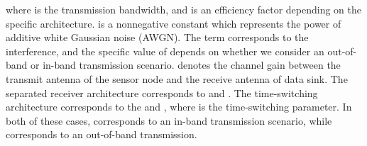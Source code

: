 \documentclass[12pt,draftclsnofoot,onecolumn]{IEEEtran}
\begin{document}
where  is the transmission bandwidth, and  is an efficiency factor depending on the specific architecture.  is a nonnegative constant which represents the power of additive white Gaussian noise (AWGN). The term  corresponds to the interference, and the specific value of  depends on whether we consider an out-of-band or in-band transmission scenario.  denotes the channel gain between the transmit antenna of the sensor node and the receive antenna of data sink. 
The separated receiver architecture corresponds to  and .
The time-switching architecture corresponds to the  and , where  is the time-switching parameter.
In both of these cases,  corresponds to an in-band transmission scenario, while  corresponds to an out-of-band transmission.






\begin{comment}
\subsubsection{Separated receiver architecture (out-of-band communication)}
Corresponds to 
\begin{itemize}
\item
	;
\item
	, .
\end{itemize}
\subsubsection{Separated receiver architecture (in-band communication)}
Corresponds to 
\begin{itemize}
\item
	;
\item
	, .
\end{itemize}
\subsubsection{Time-switching architecture (out-of-band communication)}
Corresponds to 
\begin{itemize}
\item
	, a specified constant in ;
\item
	, .
\end{itemize}

\subsubsection{Time-switching architecture (in-band communication)}

Corresponds to 
\begin{itemize}
\item
	, a specified constant in ;
\item
	, .
\end{itemize}
\end{comment}
\end{document}
